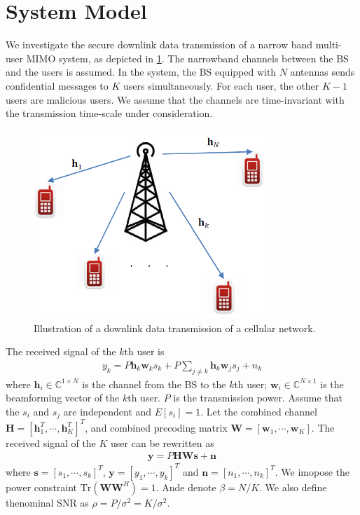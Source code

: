 \documentclass[12pt,journal,draftclsnofoot,onecolumn]{IEEEtran}
\begin{document}
\section{System Model} \label{sec:system model}
We investigate the secure downlink data transmission of a narrow band multi-user MIMO system, as depicted in \ref{fig:system}. The narrowband channels
between the BS and the users is assumed. In the system, the BS equipped with $N$ antennas sends confidential messages to $K$ users simultaneously. 
For each user, the other $K - 1$ users are malicious users. 
We assume that the
channels are time-invariant with the transmission time-scale
under consideration. 
\begin{figure}[!htbp]
	\centering
	\includegraphics[width=8.7cm]{system.png} %
	\caption{Illustration of a downlink data transmission of a cellular network.}
	\label{fig:system}
\end{figure}

The received signal of the $k$th user is 
\begin{eqnarray}
y_k = P \mathbf{h}_{k}\mathbf{w}_{k}s_k +P \sum_{j \neq k}\mathbf{h}_k\mathbf{w}_js_j + n_k
\end{eqnarray}
where $\mathbf{h}_i \in \mathbb{C}^{1 \times N}$ is the channel from the BS to the $k$th user; $\mathbf{w}_i \in \mathbb{C}^{N \times 1}$ is the beamforming vector of the $k$th user. $P$ is the transmission power. Assume that the $s_i$ and $s_j$ are independent and $E[s_i] = 1$. Let the combined channel $\mathbf{H} = [\mathbf{h}_1^T,\cdots,\mathbf{h}_K^T]^T$, and combined precoding matrix $\mathbf{W} = [\mathbf{w}_1,\cdots,\mathbf{w}_K]$. The received signal of the $K$ user can be rewritten as
\begin{eqnarray}
\mathbf{y} = P\mathbf{H}\mathbf{W}\mathbf{s} + \mathbf{n}
\end{eqnarray}
where $\mathbf{s} = [s_1,\cdots,s_k]^T$, $\mathbf{y} = [y_1,\cdots,y_k]^T$ and $\mathbf{n} = [n_1,\cdots,n_k]^T$. We imopose the power constraint $\mathrm{Tr}\left(\mathbf{W}\mathbf{W}^H\right)=1$. Ande denote $\beta = N/K$. We also define thenominal SNR as $\rho = P/\sigma^2 = K/\sigma^2$.
\end{document}
